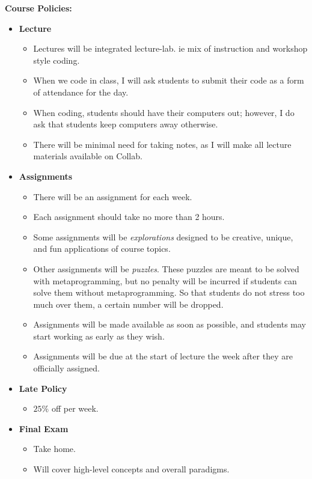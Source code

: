 \documentclass[11pt]{article}
\begin{document}
\textbf {\large Course Policies:}
\begin{itemize}
	\item \textbf {Lecture}
		\begin{itemize}
			\item Lectures will be integrated lecture-lab. ie mix of instruction and workshop style coding. 
			\item When we code in class, I will ask students to submit their code as a form of attendance for the day.
			\item When coding, students should have their computers out; however, I do ask that students keep computers away otherwise. 
			\item There will be minimal need for taking notes, as I will make all lecture materials available on Collab.
		\end{itemize}
		\item \textbf {Assignments}
		\begin{itemize}
			\item There will be an assignment for each week. 
			\item Each assignment should take no more than 2 hours.
			\item Some assignments will be \textit{explorations} designed to be creative, unique, and fun applications of course topics.
			\item Other assignments will be \textit{puzzles}. These puzzles are meant to be solved with metaprogramming, but no penalty will be incurred if students can solve them without metaprogramming. So that students do not stress too much over them, a certain number will be dropped.
			\item Assignments will be made available as soon as possible, and students may start working as early as they wish.
			\item Assignments will be due at the start of lecture the week after they are officially assigned.
		\end{itemize}
		\item \textbf {Late Policy}
		\begin{itemize}
		\item $25\%$ off per week.
		\end{itemize}
		\item \textbf {Final Exam}
		\begin{itemize}
		\item Take home.
		\item Will cover high-level concepts and overall paradigms. 
		\end{itemize}
\end{itemize}
\end{document}
